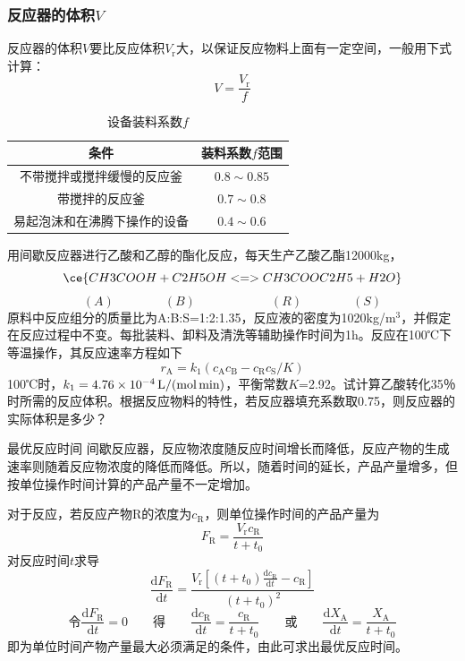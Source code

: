 \begin{frame}
    \frametitle{反应器的体积$V$}
    反应器的体积$V$要比反应体积$V_\mathrm{r}$大，以保证反应物料上面有一定空间，一般用下式计算：
    \[
        V=\frac{V_\mathrm{r}}{f}
    \]
    \begin{table}
        \centering
        \caption{设备装料系数$f$}
        \begin{tabular}{cc}
            \bottomrule
            条件 & \qquad 装料系数$f$范围\qquad  \\ \hline
            不带搅拌或搅拌缓慢的反应釜 & $0.8\sim 0.85$ \\ \hline
            带搅拌的反应釜 & $0.7\sim 0.8$ \\ \hline
            易起泡沫和在沸腾下操作的设备 & $0.4\sim 0.6$ \\ \toprule
        \end{tabular}
    \end{table}
\end{frame}


\begin{frame}[t]{}
    \begin{example}
        用间歇反应器进行乙酸和乙醇的酯化反应，每天生产乙酸乙酯12000kg，
            $$\ce{CH3COOH + C2H5OH <=> CH3COOC2H5 + H2O}$$
            $$(A)\qquad\qquad(B)\qquad\qquad\qquad(R)\qquad\qquad(S)$$
        原料中反应组分的质量比为A:B:S=1:2:1.35，反应液的密度为1020kg/m$^3$，并假定在反应过程中不变。每批装料、卸料及清洗等辅助操作时间为1h。反应在100℃下等温操作，其反应速率方程如下
        \vspace{-7pt}
        $$r_{\mathrm{A}}=k_{1}(c_{\mathrm{A}} c_{\mathrm{B}}-c_{\mathrm{R}} c_{\mathrm{S}} / K)$$
        100℃时，$k_1=\SI{4.76e{-4}}{L/(mol.min)}$，平衡常数$K$=2.92。试计算乙酸转化35％时所需的反应体积。根据反应物料的特性，若反应器填充系数取0.75，则反应器的实际体积是多少？
    \end{example}
\end{frame}


\begin{frame}{最优反应时间}
    间歇反应器，反应物浓度随反应时间增长而降低，反应产物的生成速率则随着反应物浓度的降低而降低。所以，随着时间的延长，产品产量增多，但按单位操作时间计算的产品产量不一定增加。
    
    对于反应，若反应产物R的浓度为$c_\mathrm{R}$，则单位操作时间的产品产量为
    $$F_{\mathrm{R}}=\frac{V_{\mathrm{r}} c_{\mathrm{R}}}{t+t_{0}}$$
    对反应时间$t$求导
    $$\frac{\mathrm{d} F_{\mathrm{R}}}{\mathrm{d} t}=\frac{V_{\mathrm{r}}\left[(t+t_{0}) \frac{\mathrm{d} c_{\mathrm{R}}}{\mathrm{d} t}-c_{\mathrm{R}}\right]}{\left(t+t_{0}\right)^{2}}$$
    $$\text{令}\frac{\mathrm{d} F_{\mathrm{R}}}{\mathrm{d} t}=0 \qquad\text{得}\qquad \frac{\mathrm{d} c_{\mathrm{R}}}{\mathrm{d} t}=\frac{c_{\mathrm{R}}}{t+t_{0}}\qquad\text{或}\qquad \frac{\mathrm{d} X_{\mathrm{A}}}{\mathrm{d} t}=\frac{X_{\mathrm{A}}}{t+t_{0}}$$
    即为单位时间产物产量最大必须满足的条件，由此可求出最优反应时间。
\end{frame}


